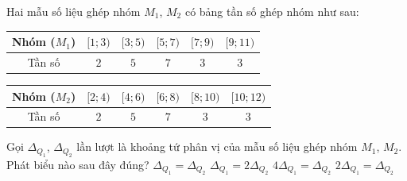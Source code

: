 \begin{ex}%
	Hai mẫu số liệu ghép nhóm $M_{1}$, $M_{2}$ có bảng tần số ghép nhóm như sau:
	\begin{center}
		\begin{tabular}{|c|c|c|c|c|c|}
			\hline
			Nhóm ($M_1$) & $[1;3)$ & $[3;5)$ & $[5;7)$ & $[7;9)$ & $[9;11)$ \\
			\hline
			Tần số & $2$ & $5$ & $7$ & $3$ & $3$ \\
			\hline
		\end{tabular}
	\end{center}
	\begin{center}
		\begin{tabular}{|c|c|c|c|c|c|}
			\hline
			Nhóm ($M_2$) & $[2;4)$ & $[4;6)$ & $[6;8)$ & $[8;10)$ & $[10;12)$ \\
			\hline
			Tần số & $2$ & $5$ & $7$ & $3$ & $3$ \\
			\hline
		\end{tabular}
	\end{center}
	Gọi $\Delta_{Q_1}$, $\Delta_{Q_2}$ lần lượt là khoảng tứ phân vị của mẫu số liệu ghép nhóm $M_{1}$, $M_{2}$. Phát biểu nào sau đây đúng?
	\choice
	{\True $\Delta_{Q_1}=\Delta_{Q_2}$}
	{$\Delta_{Q_1}=2\Delta_{Q_2}$}
	{$4\Delta_{Q_1}=\Delta_{Q_2}$}
	{$2\Delta_{Q_1}=\Delta_{Q_2}$}
\end{ex}

